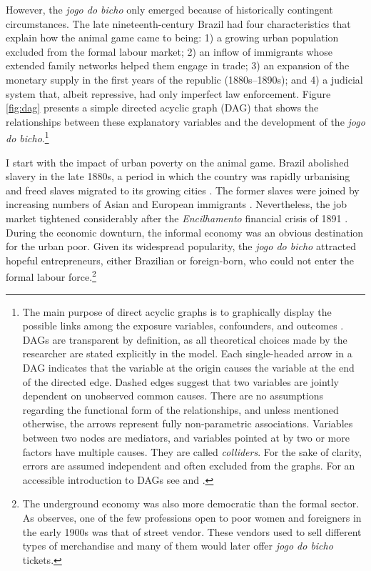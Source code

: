 \documentclass[a4paper,12pt]{article}
\begin{document}
However, the \emph{jogo do bicho} only emerged because of historically contingent circumstances. The late nineteenth-century Brazil had four characteristics that explain how the animal game came to being: 1) a growing urban population excluded from the formal labour market; 2) an inflow of immigrants whose extended family networks helped them engage in trade; 3) an expansion of the monetary supply in the first years of the republic (1880s--1890s); and 4) a judicial system that, albeit repressive, had only imperfect law enforcement. Figure \ref{fig:dag} presents a simple directed acyclic graph (DAG) \citep{pearl2009causality} that shows the relationships between these explanatory variables and the development of the \emph{jogo do bicho}.\footnote{The main purpose of direct acyclic graphs is to graphically display the possible links among the exposure variables, confounders, and outcomes \citep{morgan2014counterfactuals, pearl2009causality}. DAGs are transparent by definition, as all theoretical choices made by the researcher are stated explicitly in the model. Each single-headed arrow in a DAG indicates that the variable at the origin causes the variable at the end of the directed edge. Dashed edges suggest that two variables are jointly dependent on unobserved common causes. There are no assumptions regarding the functional form of the relationships, and unless mentioned otherwise, the arrows represent fully non-parametric associations. Variables between two nodes are mediators, and variables pointed at by two or more factors have multiple causes. They are called \emph{colliders}. For the sake of clarity, errors are assumed independent and often excluded from the graphs. For an accessible introduction to DAGs see \citet[chap. 3--4]{morgan2014counterfactuals} and \citet{pearl2016causal}.}

I start with the impact of urban poverty on the animal game. Brazil abolished slavery in the late 1880s, a period in which the country was rapidly urbanising and freed slaves migrated to its growing cities \citep{andrews1991blacks, fausto2014concise, naro1992revision, skidmore1993black}. The former slaves were joined by increasing numbers of Asian and European immigrants \citep{hall1969origins, lesser2013immigration, smith1979ethnic}. Nevertheless, the job market tightened considerably after the \emph{Encilhamento} financial crisis of 1891 \citep{topik2014political, triner2005baring}. During the economic downturn, the informal economy was an obvious destination for the urban poor. Given its widespread popularity, the \emph{jogo do bicho} attracted hopeful entrepreneurs, either Brazilian or foreign-born, who could not enter the formal labour force.\footnote{The underground economy was also more democratic than the formal sector. As \citet[115]{chazkel2011laws} observes, one of the few professions open to poor women and foreigners in the early 1900s was that of street vendor. These vendors used to sell different types of merchandise and many of them would later offer \emph{jogo do bicho} tickets.}
\end{document}
